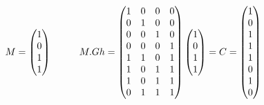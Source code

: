 \begin{align*}
  M =
  \left(
    \begin{matrix}
      1 \\
      0 \\
      1 \\
      1 \\
    \end{matrix}
  \right)
  \hspace{1cm}
  M.Gh =
  \left(
    \begin{matrix}
    1 & 0 & 0 & 0 \\
    0 & 1 & 0 & 0 \\
    0 & 0 & 1 & 0 \\
    0 & 0 & 0 & 1 \\
    1 & 1 & 0 & 1 \\
    1 & 0 & 1 & 1 \\
    1 & 0 & 1 & 1 \\
    0 & 1 & 1 & 1
    \end{matrix}
  \right)
  \left(
    \begin{matrix}
      1 \\
      0 \\
      1 \\
      1 \\
    \end{matrix}
  \right)
  = C =
  \left(
    \begin{matrix}
      1 \\
      0 \\
      1 \\
      1 \\
      1 \\
      0 \\
      1 \\
      0 \\
    \end{matrix}
  \right)
\end{align*}

